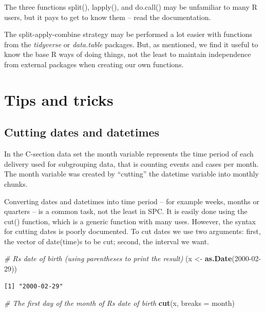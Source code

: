 \documentclass[
]{book}
\newenvironment{Shaded}{\begin{snugshade}}{\end{snugshade}}
\newcommand{\AttributeTok}[1]{\textcolor[rgb]{0.13,0.29,0.53}{#1}}
\newcommand{\CommentTok}[1]{\textcolor[rgb]{0.56,0.35,0.01}{\textit{#1}}}
\newcommand{\FunctionTok}[1]{\textcolor[rgb]{0.13,0.29,0.53}{\textbf{#1}}}
\newcommand{\NormalTok}[1]{#1}
\newcommand{\OtherTok}[1]{\textcolor[rgb]{0.56,0.35,0.01}{#1}}
\newcommand{\StringTok}[1]{\textcolor[rgb]{0.31,0.60,0.02}{#1}}
\begin{document}
The three functions split(), lapply(), and do.call() may be unfamiliar
to many R users, but it pays to get to know them -- read the
documentation.

The split-apply-combine strategy may be performed a lot easier with
functions from the \emph{tidyverse} or \emph{data.table} packages. But,
as mentioned, we find it useful to know the base R ways of doing things,
not the least to maintain independence from external packages when
creating our own functions.

\section{Tips and tricks}\label{tips-and-tricks}

\subsection{Cutting dates and
datetimes}\label{cutting-dates-and-datetimes}

In the C-section data set the month variable represents the time period
of each delivery used for subgrouping data, that is counting events and
cases per month. The month variable was created by ``cutting'' the
datetime variable into monthly chunks.

Converting dates and datetimes into time period -- for example weeks,
months or quarters -- is a common task, not the least in SPC. It is
easily done using the cut() function, which is a generic function with
many uses. However, the syntax for cutting dates is poorly documented.
To cut dates we use two arguments: first, the vector of date(time)s to
be cut; second, the interval we want.

\begin{Shaded}
\begin{Highlighting}[]
\CommentTok{\# R\textquotesingle{}s date of birth (using parentheses to print the result)}
\NormalTok{(x }\OtherTok{\textless{}{-}} \FunctionTok{as.Date}\NormalTok{(}\StringTok{\textquotesingle{}2000{-}02{-}29\textquotesingle{}}\NormalTok{))}
\end{Highlighting}
\end{Shaded}

\begin{verbatim}
[1] "2000-02-29"
\end{verbatim}

\begin{Shaded}
\begin{Highlighting}[]
\CommentTok{\# The first day of the month of R\textquotesingle{}s date of birth}
\FunctionTok{cut}\NormalTok{(x, }\AttributeTok{breaks =} \StringTok{\textquotesingle{}month\textquotesingle{}}\NormalTok{)}
\end{Highlighting}
\end{Shaded}
\end{document}

